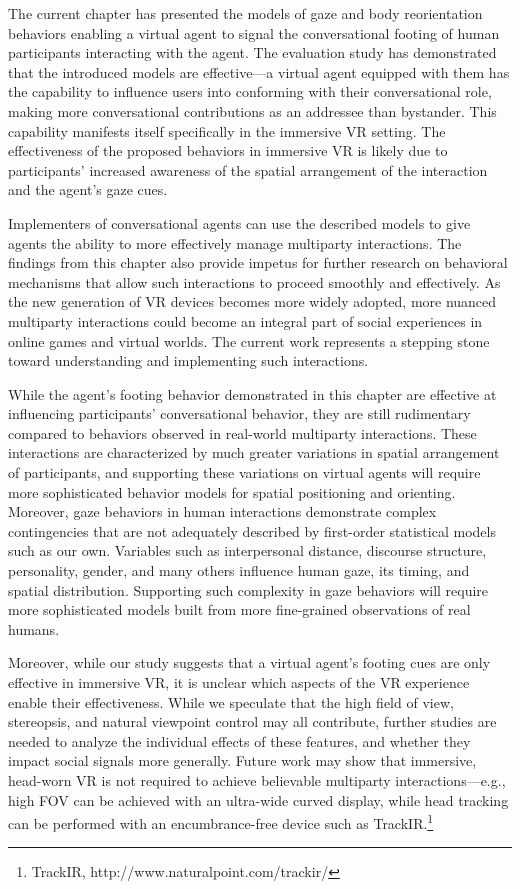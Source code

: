 The current chapter has presented the models of gaze and body reorientation behaviors enabling a virtual agent to signal the conversational footing of human participants interacting with the agent.
The evaluation study has demonstrated that the introduced models are effective---a virtual agent equipped with them has the capability to influence users into conforming with their conversational role, making more conversational contributions as an addressee than bystander. This capability manifests itself specifically in the immersive VR setting. The effectiveness of the proposed behaviors in immersive VR is likely due to participants' increased awareness of the spatial arrangement of the interaction and the agent's gaze cues.

Implementers of conversational agents can use the described models to give agents the ability to more effectively manage multiparty interactions. The findings from this chapter also provide impetus for further research on behavioral mechanisms that allow such interactions to proceed smoothly and effectively. As the new generation of VR devices becomes more widely adopted, more nuanced multiparty interactions could become an integral part of social experiences in online games and virtual worlds. The current work represents a stepping stone toward understanding and implementing such interactions.

While the agent's footing behavior demonstrated in this chapter are effective at influencing participants' conversational behavior, they are still rudimentary compared to behaviors observed in real-world multiparty interactions. These interactions are characterized by much greater variations in spatial arrangement of participants, and supporting these variations on virtual agents will require more sophisticated behavior models for spatial positioning and orienting. Moreover, gaze behaviors in human interactions demonstrate complex contingencies that are not adequately described by first-order statistical models such as our own. Variables such as interpersonal distance, discourse structure, personality, gender, and many others influence human gaze, its timing, and spatial distribution. Supporting such complexity in gaze behaviors will require more sophisticated models built from more fine-grained observations of real humans.

Moreover, while our study suggests that a virtual agent's footing cues are only effective in immersive VR, it is unclear which aspects of the VR experience enable their effectiveness. While we speculate that the high field of view, stereopsis, and natural viewpoint control may all contribute, further studies are needed to analyze the individual effects of these features, and whether they impact social signals more generally. Future work may show that immersive, head-worn VR is not required to achieve believable multiparty interactions---e.g., high FOV can be achieved with an ultra-wide curved display, while head tracking can be performed with an encumbrance-free device such as TrackIR.\footnote{TrackIR, http://www.naturalpoint.com/trackir/}